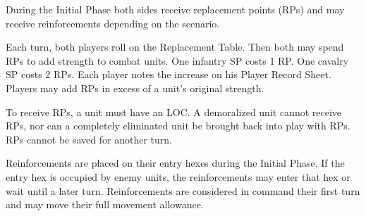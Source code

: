 
During the Initial Phase both sides receive replacement points (RPs) and may receive reinforcements depending on the scenario.


Each turn, both players roll on the Replacement Table. Then both may spend RPs to add strength to combat units. One infantry SP costs 1 RP. One cavalry SP costs 2 RPs. Each player notes the increase on his Player Record Sheet. Players may add RPs in excess of a unit's original strength.


To receive RPs, a unit must have an LOC. A demoralized unit cannot receive RPs, nor can a completely eliminated unit be brought back into play with RPs. RPs cannot be saved for another turn.


Reinforcements are placed on their entry hexes during the Initial Phase. If the entry hex is occupied by enemy units, the reinforcements may enter that hex or wait until a later turn. Reinforcements are considered in command their first turn and may move their full movement allowance.
